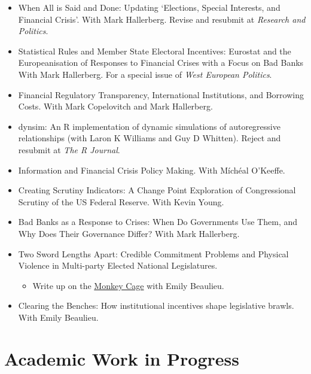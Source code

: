 \documentclass[a4paper]{article}
\begin{document}
{{\begin{itemize}
    \item When All is Said and Done: Updating `Elections, Special Interests, and Financial Crisis'. With Mark Hallerberg. Revise and resubmit at \emph{Research and Politics}.

    \item Statistical Rules and Member State Electoral Incentives: Eurostat and the Europeanisation of Responses to Financial Crises with a Focus on Bad Banks With Mark Hallerberg. For a special issue of \emph{West European Politics}.

    \item Financial Regulatory Transparency, International Institutions, and Borrowing Costs. With Mark Copelovitch and Mark Hallerberg.

    \item dynsim: An R implementation of dynamic simulations of autoregressive relationships (with Laron K Williams and Guy D Whitten). Reject and resubmit at \emph{The R Journal}.

    \item Information and Financial Crisis Policy Making. With M\'{i}ch\'{e}al O'Keeffe.

    \item Creating Scrutiny Indicators: A Change Point Exploration of Congressional Scrutiny of the US Federal Reserve. With Kevin Young.

    \item Bad Banks as a Response to Crises: When Do Governments Use Them, and Why Does Their Governance Differ? With Mark Hallerberg.

    \item Two Sword Lengths Apart: Credible Commitment Problems and Physical Violence in Multi-party Elected National Legislatures.

        \begin{itemize}
            \item Write up on the \href{http://t.co/fETbFCXcYU}{Monkey Cage} with Emily Beaulieu.
        \end{itemize}

    \item Clearing the Benches: How institutional incentives shape legislative brawls. With Emily Beaulieu.

\end{itemize}

\section*{Academic Work in Progress}

}}
\end{document}
